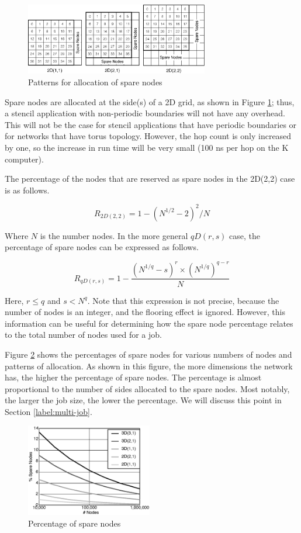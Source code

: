\documentclass[Afour,times,sagev]{sagej}
\begin{document}
\begin{figure}[ht]
\centering
\includegraphics[width=80mm]{Figs/SpareNodeAllocation.eps}
  \caption{Patterns for allocation of spare nodes }
  \label{fig:sparenode-allocation}
\end{figure}

Spare nodes are allocated at the side(s) of a 2D grid, as shown in
Figure \ref{fig:sparenode-allocation}; thus, a stencil application
with non-periodic boundaries will not have any overhead. This will not
be the case for stencil applications that have periodic boundaries or
for networks that have torus topology. However, the hop count is only
increased by one, so the increase in run time will be very small
(100 ns per hop on the K computer).

The percentage of the nodes that are reserved as spare nodes in the
2D(2,2) case is as follows.

\[
R_{2D(2,2)} = 1 - ( N^{1/2} - 2 )^2 / N
\]

Where $N$ is the number nodes. In the more general $qD(r,s)$ case, the
percentage of spare nodes can be expressed as follows.

\[
R_{qD(r,s)} = 1 - \frac{ ( N^{1/q} - s )^r \times ( N^{1/q} )^{q-r} }{ N }
\]

Here, $r \leq q$ and $s < N^q$. Note that this expression is not
precise, because the number of nodes is an integer, and the flooring
effect is ignored. However, this information can be useful for
determining how the spare node percentage relates to the total number
of nodes used for a job.

Figure \ref{fig:sparenode-percentage} shows the percentages of spare
nodes for various numbers of nodes and patterns of allocation. As
shown in this figure, the more dimensions the network has, the higher
the percentage of spare nodes. The percentage is almost proportional
to the number of sides allocated to the spare nodes. Most notably, the
larger the job size, the lower the percentage. We will discuss this
point in Section \ref{label:multi-job}.

\begin{figure}[ht]
\centering
\includegraphics[width=55mm]{Figs/R-SpareNodes.eps}
  \caption{Percentage of spare nodes}
  \label{fig:sparenode-percentage}
\end{figure}
\end{document}
